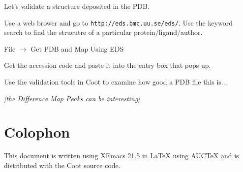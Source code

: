 \documentclass{article}
\begin{document}
\begin{trivlist}
\item Let's validate a structure deposited in the PDB.

\item Use a web brower and go to \texttt{http://eds.bmc.uu.se/eds/}.  Use
the keyword search to find the strucutre of a particular
protein/ligand/author.  

\item \textsf{File $\rightarrow$ Get PDB and Map Using EDS}
  
\item Get the accession code and paste it into the entry box that pops
  up.
  
\item Use the validation tools in Coot to examine how good a PDB file
  this is... 

\item \emph{[the Difference Map Peaks can be interesting]}

\end{trivlist}


\section*{Colophon}

This document is written using XEmacs 21.5 in \LaTeX{} using AUC\TeX{}
and is distributed with the Coot source code.
\end{document}
